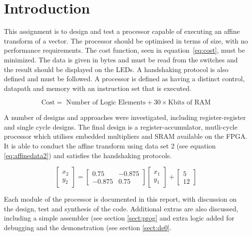 
\section{Introduction}\label{sect:intro}

This assignment is to design and test a processor capable of executing an affine transform of a vector. 
The processor should be optimised in terms of size, with no performance requirements. 
The cost function, seen in equation~\eqref{eq:cost}, must be minimized. 
The data is given in bytes and must be read from the switches and the result should be displayed on the LEDs. 
A handshaking protocol is also defined and must be followed. 
A processor is defined as having a distinct control, datapath and memory with an instruction set that is executed. 

\begin{equation}\label{eq:cost}
\mbox{Cost} = \mbox{ Number of Logic Elements} + 30 \times \mbox{Kbits of RAM}
\end{equation}

A number of designs and approaches were investigated, including register-register and single cycle designs.
The final design is a register-accumulator, mutli-cycle processor which utilises embedded multipliers and SRAM available on the FPGA. 
It is able to conduct the affine transform using data set 2 (see equation \ref{eq:affinedata2}) and satisfies the handshaking protocols. 

\begin{equation}\label{eq:affinedata2}
\begin{bmatrix}
x_2 \\
y_2 
\end{bmatrix}
=
\begin{bmatrix}
0.75 & -0.875 \\
-0.875 & 0.75 
\end{bmatrix}
\begin{bmatrix}
x_1 \\
y_1
\end{bmatrix}
+
\begin{bmatrix}
5 \\
12
\end{bmatrix}
\end{equation}


Each module of the processor is documented in this report, with discussion on the design, test and synthesis of the code. 
Additional extras are also discussed, including a simple assembler (see section \ref{sect:prog} and extra logic added for debugging and the demonstration (see section \ref{sect:de0}.
